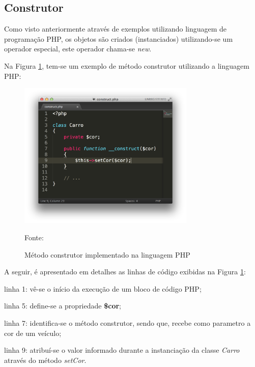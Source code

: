 \subsection{Construtor}

Como visto anteriormente através de exemplos utilizando linguagem de
programação \acs{PHP}, os objetos são criados (instanciados) utilizando-se um
operador especial, este operador chama-se \textit{new}.


Na Figura \ref{fig:metodoConstrutor}, tem-se um exemplo de método construtor
utilizando a linguagem \acs{PHP}:

\begin{figure}[h!tb]
	\caption{Método construtor implementado na linguagem PHP}
	\label{fig:metodoConstrutor}

	\centering
	\includegraphics[width=0.75\textwidth]{images/construct.png}

	\centering
	\footnotesize Fonte: \fonteOAutor
\end{figure}

\FloatBarrier 	%

A seguir, é apresentado em detalhes as linhas de código exibidas na Figura
\ref{fig:metodoConstrutor}:

\begin{alineas}
    \item linha 1: vê-se o início da execução de um bloco de código PHP;
    \item linha 5: define-se a propriedade \textbf{\$cor};
    \item linha 7: identifica-se o método construtor, sendo que, recebe como
    parametro a cor de um veículo;
    \item linha 9: atribuí-se o valor informado durante a instanciação da classe
    \textit{Carro} através do método \textit{setCor}.
\end{alineas}

